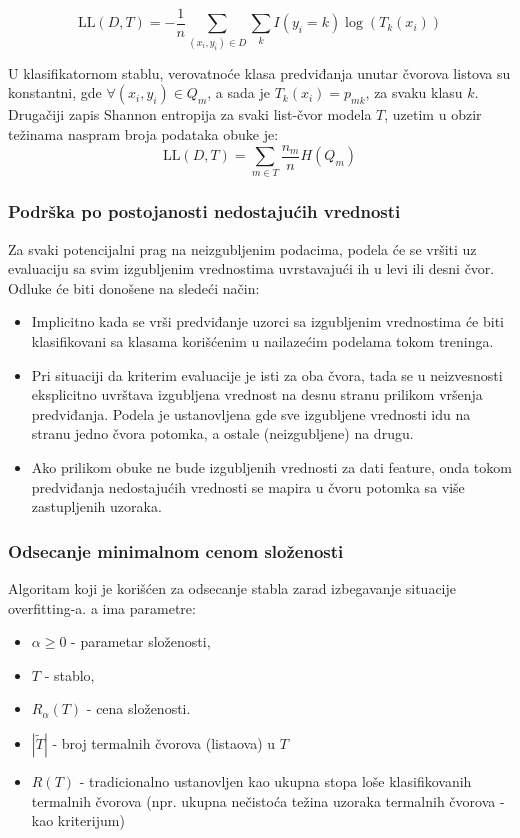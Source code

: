 \documentclass[fontsize=12bp, paper=a4]{scrarticle}
\begin{document}
$$\mathrm{LL}(D, T) = -\frac{1}{n} \sum_{(x_i, y_i) \in D} \sum_k I(y_i = k) \log(T_k(x_i))$$

U klasifikatornom stablu, verovatnoće klasa predviđanja unutar čvorova listova su konstantni, gde $\forall (x_i, y_i) \in Q_m$, a sada je $T_k(x_i) = p_{mk}$, za svaku klasu $k$. Drugačiji zapis Shannon entropija za svaki list-čvor modela $T$, uzetim u obzir težinama naspram broja podataka obuke je: 
$$\mathrm{LL}(D, T) = \sum_{m \in T} \frac{n_m}{n} H(Q_m)$$


\subsubsection{Podrška po postojanosti nedostajućih vrednosti}
Za svaki potencijalni prag na neizgubljenim podacima, podela će se vršiti uz evaluaciju sa svim izgubljenim vrednostima uvrstavajući ih u levi ili desni čvor.
\\

Odluke će biti donošene na sledeći način:
\begin{itemize}
    \item Implicitno kada se vrši predviđanje uzorci sa izgubljenim vrednostima će biti klasifikovani sa klasama korišćenim u nailazećim podelama tokom treninga.
    \item Pri situaciji da kriterim evaluacije je isti za oba čvora, tada se u neizvesnosti eksplicitno uvrštava izgubljena vrednost na desnu stranu prilikom vršenja predviđanja. Podela je ustanovljena gde sve izgubljene vrednosti idu na stranu jedno čvora potomka, a ostale (neizgubljene) na drugu.
    \item Ako prilikom obuke ne bude izgubljenih vrednosti za dati feature, onda tokom predviđanja nedostajućih vrednosti se mapira u čvoru potomka sa više zastupljenih uzoraka.
\end{itemize}    


\subsubsection{Odsecanje minimalnom cenom složenosti}
Algoritam koji je korišćen za odsecanje stabla zarad izbegavanje situacije overfitting-a. a ima parametre:
\begin{itemize}
    \item $\alpha\ge0$ - parametar složenosti,
    \item $T$ - stablo,
    \item $R_\alpha(T)$ - cena složenosti.
    \item $|\widetilde{T}|$ - broj termalnih čvorova (listaova) u $T$
    \item $R(T)$ - tradicionalno ustanovljen kao ukupna stopa loše klasifikovanih termalnih čvorova (npr. ukupna nečistoća težina uzoraka termalnih čvorova - kao kriterijum)
\end{itemize}
\end{document}
